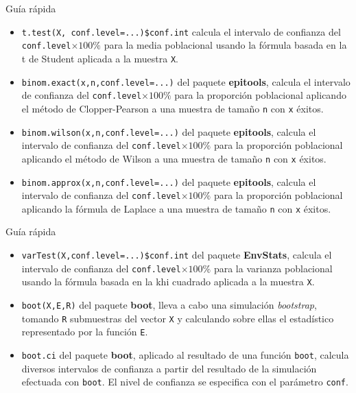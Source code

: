\documentclass[ignorenonframetext,]{beamer}
\begin{document}
\begin{frame}[fragile]{Guía rápida}
\protect\hypertarget{guia-rapida}{}

\begin{itemize}
\item
  \texttt{t.test(X,\ conf.level=...)\$conf.int} calcula el intervalo de
  confianza del \texttt{conf.level}\(\times 100\%\) para la media
  poblacional usando la fórmula basada en la t de Student aplicada a la
  muestra \texttt{X}.
\item
  \texttt{binom.exact(x,n,conf.level=...)} del paquete
  \textbf{epitools}, calcula el intervalo de confianza del
  \texttt{conf.level}\(\times 100\%\) para la proporción poblacional
  aplicando el método de Clopper-Pearson a una muestra de tamaño
  \texttt{n} con \texttt{x} éxitos.
\item
  \texttt{binom.wilson(x,n,conf.level=...)} del paquete
  \textbf{epitools}, calcula el intervalo de confianza del
  \texttt{conf.level}\(\times 100\%\) para la proporción poblacional
  aplicando el método de Wilson a una muestra de tamaño \texttt{n} con
  \texttt{x} éxitos.
\item
  \texttt{binom.approx(x,n,conf.level=...)} del paquete
  \textbf{epitools}, calcula el intervalo de confianza del
  \texttt{conf.level}\(\times 100\%\) para la proporción poblacional
  aplicando la fórmula de Laplace a una muestra de tamaño \texttt{n} con
  \texttt{x} éxitos.
\end{itemize}

\end{frame}

\begin{frame}[fragile]{Guía rápida}
\protect\hypertarget{guia-rapida-1}{}

\begin{itemize}
\item
  \texttt{varTest(X,conf.level=...)\$conf.int} del paquete
  \textbf{EnvStats}, calcula el intervalo de confianza del
  \texttt{conf.level}\(\times 100\%\) para la varianza poblacional
  usando la fórmula basada en la khi cuadrado aplicada a la muestra
  \texttt{X}.
\item
  \texttt{boot(X,E,R)} del paquete \textbf{boot}, lleva a cabo una
  simulación \emph{bootstrap}, tomando \texttt{R} submuestras del vector
  \texttt{X} y calculando sobre ellas el estadístico representado por la
  función \texttt{E}.
\item
  \texttt{boot.ci} del paquete \textbf{boot}, aplicado al resultado de
  una función \texttt{boot}, calcula diversos intervalos de confianza a
  partir del resultado de la simulación efectuada con \texttt{boot}. El
  nivel de confianza se especifica con el parámetro \texttt{conf}.
\end{itemize}

\end{frame}
\end{document}
